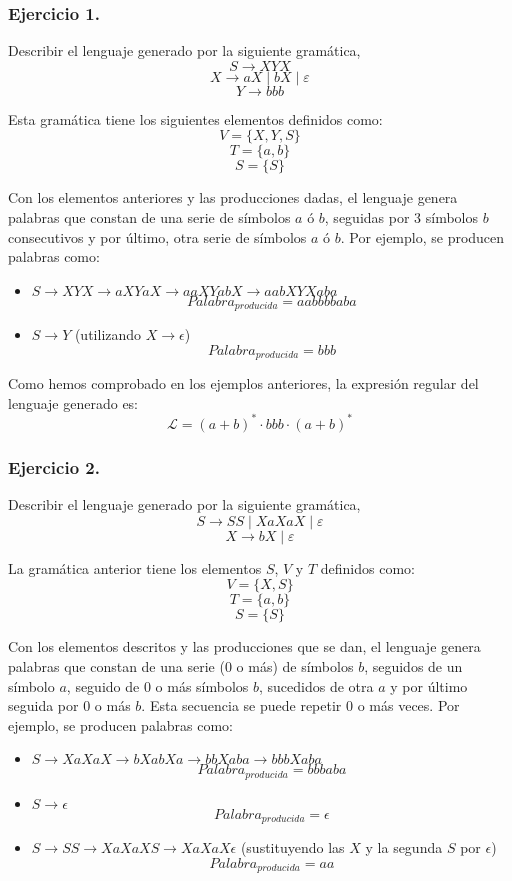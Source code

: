 \documentclass[11pt,a4paper]{article}
\begin{document}
\subsubsection{Ejercicio 1.} Describir el lenguaje generado por la siguiente gramática,\\
	\[S\rightarrow XYX \]
	\[X\rightarrow aX \mid bX \mid \varepsilon\]
	\[Y\rightarrow bbb\]
	
Esta gramática tiene los siguientes elementos definidos como:
	\[V=\{X,Y,S\}\]
	\[T=\{a,b\}\]
	\[S=\{S\}\]
	
Con los elementos anteriores y las producciones dadas, el lenguaje genera palabras que constan de una serie de símbolos $a$ ó $b$, seguidas por 3 símbolos $b$ consecutivos y por último, otra serie de símbolos $a$ ó $b$. Por ejemplo, se producen palabras como:

	\begin{itemize}
	\item $S\rightarrow XYX\rightarrow aXYaX\rightarrow aaXYabX \rightarrow aabXYXaba$
	\[Palabra_{producida}=aabbbbaba\]
	\item $S\rightarrow Y$ (utilizando $X\rightarrow \epsilon$)
	\[Palabra_{producida}=bbb\]
	\end{itemize}
	
Como hemos comprobado en los ejemplos anteriores, la expresión regular del lenguaje generado es:
	\[\mathcal{L}=(a+b)^{*}\cdot bbb\cdot (a+b)^{*}\]

\subsubsection{Ejercicio 2.} Describir el lenguaje generado por la siguiente gramática,\\
	\[S\rightarrow SS \mid XaXaX \mid \varepsilon \]
	\[X\rightarrow bX \mid \varepsilon\]
	
La gramática anterior tiene los elementos $S$, $V$ y $T$ definidos como:
	\[V=\{X,S\}\]
	\[T=\{a,b\}\]
	\[S=\{S\}\]
	
Con los elementos descritos y las producciones que se dan, el lenguaje genera palabras que constan de una serie (0 o más) de símbolos $b$, seguidos de un símbolo $a$, seguido de 0 o más símbolos $b$, sucedidos de otra $a$ y por último seguida por 0 o más $b$. Esta secuencia se puede repetir 0 o más veces. Por ejemplo, se producen palabras como:

	\begin{itemize}
	\item $S\rightarrow XaXaX\rightarrow bXabXa\rightarrow bbXaba\rightarrow bbbXaba$
	\[Palabra_{producida}=bbbaba\]
	\item $S\rightarrow \epsilon$
	\[Palabra_{producida}=\epsilon\]
	\item $S\rightarrow SS\rightarrow XaXaXS\rightarrow XaXaX\epsilon$ (sustituyendo las $X$ y la segunda $S$ por $\epsilon$)
	\[Palabra_{producida}=aa\]
	\end{itemize}
	
\end{document}
